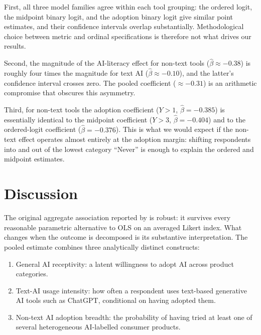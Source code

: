 \documentclass[11pt]{article}
\begin{document}
First, all three model families agree within each tool grouping: the ordered
logit, the midpoint binary logit, and the adoption binary logit give similar
point estimates, and their confidence intervals overlap substantially.
Methodological choice between metric and ordinal specifications is therefore
not what drives our results.

Second, the magnitude of the AI-literacy effect for non-text tools
($\hat\beta \approx -0.38$) is roughly four times the magnitude for text AI
($\hat\beta \approx -0.10$), and the latter's confidence interval crosses
zero. The pooled coefficient ($\approx -0.31$) is an arithmetic compromise
that obscures this asymmetry.

Third, for non-text tools the adoption coefficient ($Y > 1$,
$\hat\beta = -0.385$) is essentially identical to the midpoint coefficient
($Y > 3$, $\hat\beta = -0.404$) and to the ordered-logit coefficient
($\hat\beta = -0.376$). This is what we would expect if the non-text effect
operates almost entirely at the adoption margin: shifting respondents
into and out of the lowest category ``Never'' is enough to explain the
ordered and midpoint estimates.

\section{Discussion}

The original aggregate association reported by \citet{tully2025lower} is
robust: it survives every reasonable parametric alternative to OLS on an
averaged Likert index. What changes when the outcome is decomposed is its
substantive interpretation. The pooled estimate combines three
analytically distinct constructs:

\begin{enumerate}
  \item General AI receptivity: a latent willingness to adopt AI
    across product categories.
  \item Text-AI usage intensity: how often a respondent uses
    text-based generative AI tools such as ChatGPT, conditional on having
    adopted them.
  \item Non-text AI adoption breadth: the probability of having
    tried at least one of several heterogeneous AI-labelled consumer
    products.
\end{enumerate}
\end{document}
